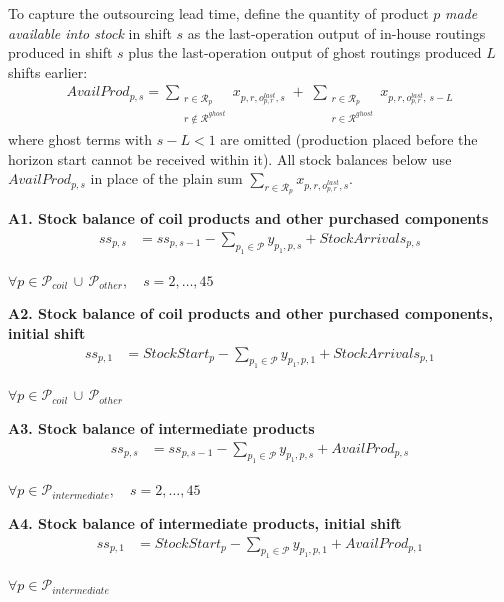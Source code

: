 \documentclass{article}
\begin{document}
To capture the outsourcing lead time, define the quantity of product $p$ \emph{made available into stock} in shift $s$ as the last-operation output of in-house routings produced in shift $s$ plus the last-operation output of ghost routings produced $L$ shifts earlier:
\begin{align}
AvailProd_{p,s}
=
\sum_{\substack{r \in \mathcal{R}_p \\ r \notin \mathcal{R}^{ghost}}}
x_{p,r,o^{last}_{p,r},s}
\;+\;
\sum_{\substack{r \in \mathcal{R}_p \\ r \in \mathcal{R}^{ghost}}}
x_{p,r,o^{last}_{p,r},\,s-L}
\label{eq:avail_prod}
\end{align}
where ghost terms with $s-L < 1$ are omitted (production placed before the horizon start cannot be received within it). All stock balances below use $AvailProd_{p,s}$ in place of the plain sum $\sum_{r \in \mathcal{R}_p} x_{p,r,o^{last}_{p,r},s}$.

\noindent\textbf{A1. Stock balance of coil products and other purchased components}
\begin{align}
ss_{p,s}
&=
ss_{p,s-1}
- \sum_{p_1 \in \mathcal{P}} y_{p_1,p,s}
+ StockArrivals_{p,s}
\label{eq:A1_coil_balance}
\end{align}
\begin{center}
$\forall p \in \mathcal{P}_{coil} \, \cup \, \mathcal{P}_{other}, \quad s = 2,\dots,45$
\end{center}

\noindent\textbf{A2. Stock balance of coil products and other purchased components, initial shift}
\begin{align}
ss_{p,1}
&=
StockStart_p
- \sum_{p_1 \in \mathcal{P}} y_{p_1,p,1}
+ StockArrivals_{p,1}
\label{eq:A2_coil_initial}
\end{align}
\begin{center}
$\forall p \in \mathcal{P}_{coil} \, \cup \, \mathcal{P}_{other}$
\end{center}

\noindent\textbf{A3. Stock balance of intermediate products}
\begin{align}
ss_{p,s}
&=
ss_{p,s-1}
- \sum_{p_1 \in \mathcal{P}} y_{p_1,p,s}
+ AvailProd_{p,s}
\label{eq:A3_intermediate_balance}
\end{align}
\begin{center}
$\forall p \in \mathcal{P}_{intermediate}, \quad s = 2,\dots,45$
\end{center}

\noindent\textbf{A4. Stock balance of intermediate products, initial shift}
\begin{align}
ss_{p,1}
&=
StockStart_p
- \sum_{p_1 \in \mathcal{P}} y_{p_1,p,1}
+ AvailProd_{p,1}
\label{eq:A4_intermediate_initial}
\end{align}
\begin{center}
$\forall p \in \mathcal{P}_{intermediate}$
\end{center}
\end{document}
